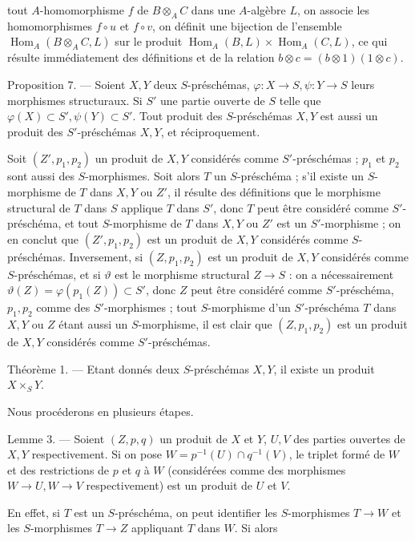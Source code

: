 tout $A$-homomorphisme $f$ de $B \otimes_A C$ dans une $A$-algèbre $L$, on associe les homomorphismes $f \circ u$ et $f \circ v$, on définit une bijection de l'ensemble $\operatorname{Hom}_A(B \otimes_A C, L)$ sur le produit $\operatorname{Hom}_A(B, L) \times \operatorname{Hom}_A(C, L)$, ce qui résulte immédiatement des définitions et de la relation $b \otimes c = (b \otimes 1)(1 \otimes c)$.

Proposition 7. — Soient $X, Y$ deux $S$-préschémas, $\varphi : X \to S, \psi : Y \to S$ leurs morphismes structuraux. Si $S'$ une partie ouverte de $S$ telle que $\varphi(X) \subset S', \psi(Y) \subset S'$. Tout produit des $S$-préschémas $X, Y$ est aussi un produit des $S'$-préschémas $X, Y$, et réciproquement.

Soit $(Z', p_1, p_2)$ un produit de $X, Y$ considérés comme $S'$-préschémas ; $p_1$ et $p_2$ sont aussi des $S$-morphismes. Soit alors $T$ un $S$-préschéma ; s'il existe un $S$-morphisme de $T$ dans $X, Y$ ou $Z'$, il résulte des définitions que le morphisme structural de $T$ dans $S$ applique $T$ dans $S'$, donc $T$ peut être considéré comme $S'$-préschéma, et tout $S$-morphisme de $T$ dans $X, Y$ ou $Z'$ est un $S'$-morphisme ; on en conclut que $(Z', p_1, p_2)$ est un produit de $X, Y$ considérés comme $S$-préschémas. Inversement, si $(Z, p_1, p_2)$ est un produit de $X, Y$ considérés comme $S$-préschémas, et si $\vartheta$ est le morphisme structural $Z \to S$ : on a nécessairement $\vartheta(Z) = \varphi(p_1(Z)) \subset S'$, donc $Z$ peut être considéré comme $S'$-préschéma, $p_1, p_2$ comme des $S'$-morphismes ; tout $S$-morphisme d'un $S'$-préschéma $T$ dans $X, Y$ ou $Z$ étant aussi un $S$-morphisme, il est clair que $(Z, p_1, p_2)$ est un produit de $X, Y$ considérés comme $S'$-préschémas.

Théorème 1. — Etant donnés deux $S$-préschémas $X, Y$, il existe un produit $X \times_S Y$.

Nous procéderons en plusieurs étapes.

Lemme 3. — Soient $(Z, p, q)$ un produit de $X$ et $Y$, $U, V$ des parties ouvertes de $X, Y$ respectivement. Si on pose $W = p^{-1}(U) \cap q^{-1}(V)$, le triplet formé de $W$ et des restrictions de $p$ et $q$ à $W$ (considérées comme des morphismes $W \to U, W \to V$ respectivement) est un produit de $U$ et $V$.

En effet, si $T$ est un $S$-préschéma, on peut identifier les $S$-morphismes $T \to W$ et les $S$-morphismes $T \to Z$ appliquant $T$ dans $W$. Si alors


